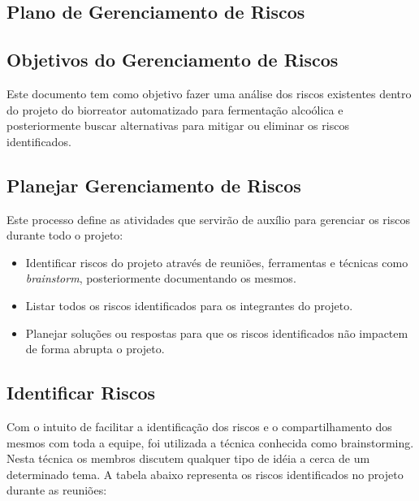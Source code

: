 \begin{anexosenv}

\partanexos

\chapter{Plano de Gerenciamento de Riscos}

\section{Objetivos do Gerenciamento de Riscos}

Este documento tem como objetivo fazer uma análise dos riscos existentes dentro do projeto do biorreator automatizado para fermentação alcoólica e posteriormente buscar alternativas para mitigar ou eliminar os riscos identificados.

\section{Planejar Gerenciamento de Riscos}

Este processo define as atividades que servirão de auxílio para gerenciar os riscos durante todo o projeto:

\begin{itemize}
\item Identificar riscos do projeto através de reuniões, ferramentas e técnicas como \textit{brainstorm},  posteriormente documentando os mesmos.
\item Listar todos os riscos identificados para os integrantes do projeto.
\item Planejar soluções ou respostas para que os riscos identificados não impactem de forma abrupta o projeto.
\end{itemize}

\section{Identificar Riscos}

Com o intuito de facilitar a identificação dos riscos e o compartilhamento dos mesmos com toda a equipe, foi utilizada a técnica conhecida como brainstorming. Nesta técnica os membros discutem qualquer tipo de idéia a cerca de um determinado tema. A tabela abaixo representa os riscos identificados no projeto durante as reuniões:


\end{anexosenv}
